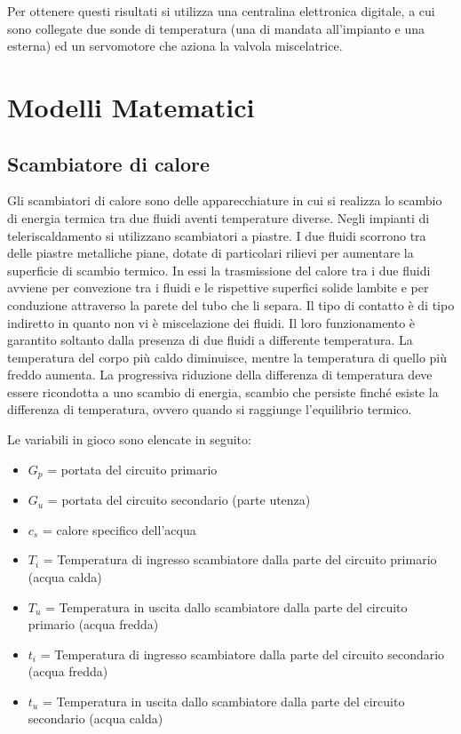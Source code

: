 \documentclass[laurea,oneside,11pt]{USiena_tesiLM}
\begin{document}
Per ottenere questi risultati si utilizza una centralina elettronica digitale, a cui sono collegate due sonde di temperatura (una di mandata all'impianto e una esterna) ed un servomotore che aziona la valvola miscelatrice. 

\chapter{Modelli Matematici}
\section{Scambiatore di calore}
Gli scambiatori di calore sono  delle apparecchiature in cui si realizza lo scambio di energia termica tra due fluidi aventi temperature diverse. Negli impianti di teleriscaldamento si utilizzano scambiatori a piastre. I due fluidi scorrono tra delle piastre metalliche piane, dotate di particolari rilievi per aumentare la superficie di scambio termico. In essi la trasmissione del calore tra i due fluidi avviene per convezione tra i fluidi e le rispettive superfici solide lambite e per conduzione attraverso la parete del tubo che li separa. Il tipo di contatto è di tipo indiretto in quanto non vi è miscelazione dei fluidi.
Il loro funzionamento è garantito soltanto dalla presenza di due fluidi a differente temperatura. La temperatura del corpo più caldo diminuisce, mentre la temperatura di quello più freddo aumenta. La progressiva riduzione della differenza di temperatura deve essere ricondotta a uno scambio di energia, scambio che persiste finché esiste la differenza di temperatura, ovvero quando si raggiunge l'equilibrio termico. 

Le variabili in gioco sono elencate in seguito:
\begin{itemize}
\item[] $G_p$ = portata del circuito primario
\item[]$G_u$ = portata del circuito secondario (parte utenza)
\item[]$c_s$ = calore specifico dell'acqua
\item[]$T_i$ = Temperatura di ingresso scambiatore dalla parte del circuito primario (acqua calda)
\item[]$T_u$ = Temperatura in uscita dallo scambiatore dalla parte del circuito primario (acqua fredda)
\item[]$t_i$ = Temperatura di ingresso scambiatore dalla parte del circuito secondario (acqua fredda)
\item[]$t_u$ = Temperatura in uscita dallo scambiatore dalla parte del circuito secondario (acqua calda)
\end{itemize}
\end{document}

